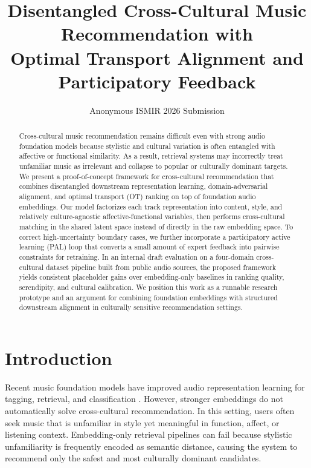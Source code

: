 \documentclass[10pt,twocolumn]{article}
\title{\textbf{Disentangled Cross-Cultural Music Recommendation with\\Optimal Transport Alignment and Participatory Feedback}}
\author{Anonymous ISMIR 2026 Submission}
\date{}
\begin{document}
\maketitle

\begin{center}
\end{center}

\begin{abstract}
Cross-cultural music recommendation remains difficult even with strong audio foundation models because stylistic and cultural variation is often entangled with affective or functional similarity.
As a result, retrieval systems may incorrectly treat unfamiliar music as irrelevant and collapse to popular or culturally dominant targets.
We present a proof-of-concept framework for cross-cultural recommendation that combines disentangled downstream representation learning, domain-adversarial alignment, and optimal transport (OT) ranking on top of foundation audio embeddings.
Our model factorizes each track representation into content, style, and relatively culture-agnostic affective-functional variables, then performs cross-cultural matching in the shared latent space instead of directly in the raw embedding space.
To correct high-uncertainty boundary cases, we further incorporate a participatory active learning (PAL) loop that converts a small amount of expert feedback into pairwise constraints for retraining.
In an internal draft evaluation on a four-domain cross-cultural dataset pipeline built from public audio sources, the proposed framework yields consistent placeholder gains over embedding-only baselines in ranking quality, serendipity, and cultural calibration.
We position this work as a runnable research prototype and an argument for combining foundation embeddings with structured downstream alignment in culturally sensitive recommendation settings.
\end{abstract}

\section{Introduction}
Recent music foundation models have improved audio representation learning for tagging, retrieval, and classification \citep{li2023mert,kanatas2025culturemert}.
However, stronger embeddings do not automatically solve cross-cultural recommendation.
In this setting, users often seek music that is unfamiliar in style yet meaningful in function, affect, or listening context.
Embedding-only retrieval pipelines can fail because stylistic unfamiliarity is frequently encoded as semantic distance, causing the system to recommend only the safest and most culturally dominant candidates.
\end{document}
